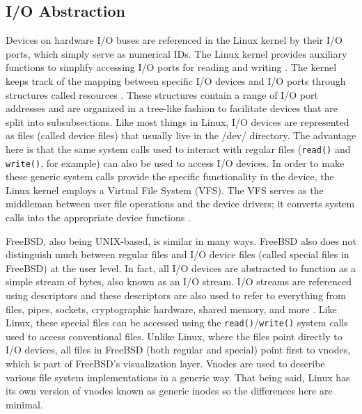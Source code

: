 \documentclass[onecolumn, draftclsnofoot,10pt, compsoc]{IEEEtran}
\begin{document}
\subsection{I/O Abstraction}
Devices on hardware I/O buses are referenced in the Linux kernel by their I/O ports, which simply serve as numerical IDs. The Linux kernel provides auxiliary functions to simplify accessing I/O ports for reading and writing \cite{LinuxKernel}. The kernel keeps track of the mapping between specific I/O devices and I/O ports through structures called resources \cite{LinuxKernel}. These structures contain a range of I/O port addresses and are organized in a tree-like fashion to facilitate devices that are split into subsubsections. Like most things in Linux, I/O devices are represented as files (called device files) that usually live in the /dev/ directory. The advantage here is that the same system calls used to interact with regular files (\verb`read()` and \verb`write()`, for example) can also be used to access I/O devices. In order to make these generic system calls provide the specific functionality in the device, the Linux kernel employs a Virtual File System (VFS). The VFS serves as the middleman between user file operations and the device drivers; it converts system calls into the appropriate device functions \cite{LinuxKernel}.

FreeBSD, also being UNIX-based, is similar in many ways. FreeBSD also does not distinguish much between regular files and I/O device files (called special files in FreeBSD) at the user level. In fact, all I/O devices are abstracted to function as a simple stream of bytes, also known as an I/O stream. I/O streams are referenced using descriptors and these descriptors are also used to refer to everything from files, pipes, sockets, cryptographic hardware, shared memory, and more \cite{FreeBSD}. Like Linux, these special files can be accessed using the \verb`read()`/\verb`write()` system calls used to access conventional files. Unlike Linux, where the files point directly to I/O devices, all files in FreeBSD (both regular and special) point first to vnodes, which is part of FreeBSD's visualization layer. Vnodes are used to describe various file system implementations in a generic way. That being said, Linux has its own version of vnodes known as generic inodes so the differences here are minimal.
\end{document}
